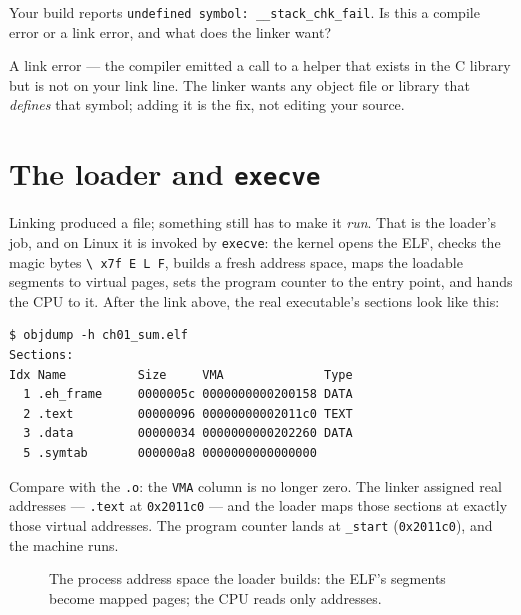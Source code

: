 \begin{checkpoint}
Your build reports \texttt{undefined symbol: \_\_stack\_chk\_fail}.
Is this a compile error or a link error, and what does the linker want?
\end{checkpoint}
\begin{solution}
A link error --- the compiler emitted a call to a helper that exists in
the C library but is not on your link line. The linker wants any object
file or library that \emph{defines} that symbol; adding it is the fix,
not editing your source.
\end{solution}

\section{The loader and \texttt{execve}}
\label{sec:exec01}

Linking produced a file; something still has to make it \emph{run}. That
is the loader's job, and on Linux it is invoked by \texttt{execve}: the
kernel opens the ELF, checks the magic bytes \texttt{\textbackslash
x7f~E~L~F}, builds a fresh address space, maps the loadable segments to
virtual pages, sets the program counter to the entry point, and hands
the CPU to it. After the link above, the real executable's sections
look like this:

\begin{lstlisting}[basicstyle=\ttfamily\scriptsize]
$ objdump -h ch01_sum.elf
Sections:
Idx Name          Size     VMA              Type
  1 .eh_frame     0000005c 0000000000200158 DATA
  2 .text         00000096 00000000002011c0 TEXT
  3 .data         00000034 0000000000202260 DATA
  5 .symtab       000000a8 0000000000000000
\end{lstlisting}

Compare with the \texttt{.o}: the \texttt{VMA} column is no longer zero.
The linker assigned real addresses --- \texttt{.text} at
\texttt{0x2011c0} --- and the loader maps those sections at exactly those
virtual addresses. The program counter lands at \texttt{\_start}
(\texttt{0x2011c0}), and the machine runs.

\begin{figure}[htbp]
\centering

\caption{The process address space the loader builds: the ELF's
segments become mapped pages; the CPU reads only addresses.}
\label{fig:address01}
\end{figure}

